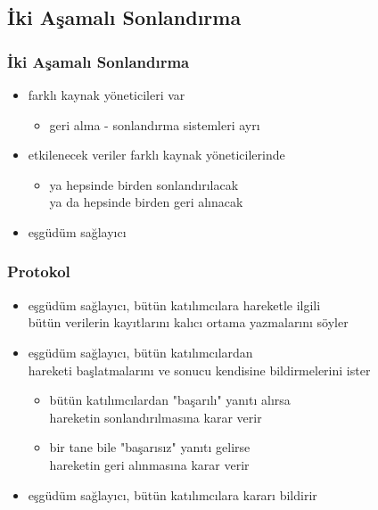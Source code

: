 \documentclass[dvipsnames]{beamer}
\theoremstyle{definition}
\theoremstyle{example}
\theoremstyle{plain}
\begin{document}
\subsection{İki Aşamalı Sonlandırma}

\begin{frame}
  \frametitle{İki Aşamalı Sonlandırma}

  \begin{itemize}
    \item farklı kaynak yöneticileri var
    \begin{itemize}
      \item geri alma - sonlandırma sistemleri ayrı
    \end{itemize}

    \pause
    \item etkilenecek veriler farklı kaynak yöneticilerinde
    \begin{itemize}
      \item ya hepsinde birden sonlandırılacak\\
        ya da hepsinde birden geri alınacak
    \end{itemize}

    \pause
    \item \alert{eşgüdüm sağlayıcı}
  \end{itemize}
\end{frame}

\begin{frame}
  \frametitle{Protokol}

  \begin{itemize}
    \item eşgüdüm sağlayıcı, bütün katılımcılara hareketle ilgili\\
      bütün verilerin kayıtlarını kalıcı ortama yazmalarını söyler

    \pause
    \item eşgüdüm sağlayıcı, bütün katılımcılardan\\
      hareketi başlatmalarını ve sonucu kendisine bildirmelerini ister
    \begin{itemize}
      \item bütün katılımcılardan "başarılı" yanıtı alırsa\\
        hareketin sonlandırılmasına karar verir
      \item bir tane bile "başarısız" yanıtı gelirse\\
        hareketin geri alınmasına karar verir
    \end{itemize}

    \pause
    \item eşgüdüm sağlayıcı, bütün katılımcılara kararı bildirir
  \end{itemize}
\end{frame}
\end{document}
